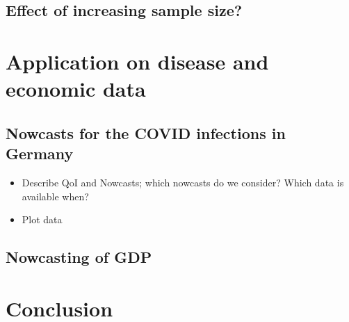 \documentclass[oneside]{article}
\theoremstyle{plain}%
\theoremstyle{definition}
\begin{document}
\subsection{Effect of increasing sample size?}

\section{Application on disease and economic data}

\subsection{Nowcasts for the COVID infections in Germany}

\begin{itemize}
  \item Describe QoI and Nowcasts; which nowcasts do we consider? Which data is available when?
  \item Plot data
\end{itemize}

\subsection{Nowcasting of GDP}

\section{Conclusion}
\medskip
\printbibliography
\end{document}
